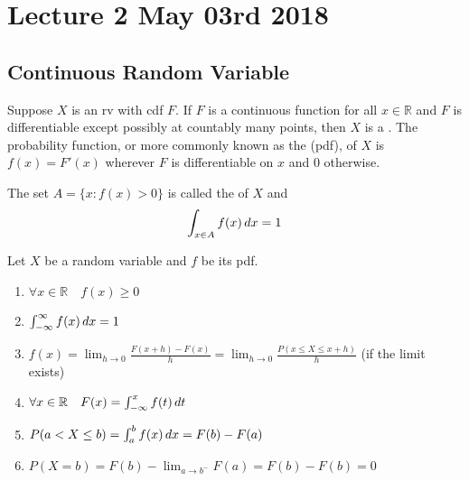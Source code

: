 \documentclass[notoc,notitlepage]{tufte-book}
\begin{document}


\chapter{Lecture 2 May 03rd 2018}
  \label{chapter:lecture_2_may_03rd_2018}

\section{Continuous Random Variable} %
\label{sec:continuous_random_variable}

\begin{defn}\label{defn:continuous_random_variable}
  Suppose $X$ is an rv with cdf $F$. If $F$ is a continuous function for all $x \in \mathbb{R}$ and $F$ is differentiable except possibly at countably many points, then $X$ is a . The probability function, or more commonly known as the  (pdf), of $X$ is $f(x) = F'(x)$ wherever $F$ is differentiable on $x$ and $0$ otherwise.

  The set $A = \{x : f(x) > 0\}$ is called the  of $X$ and
  \begin{equation*}
    \int_{x \in A} f(x) \mathop{}\!d{x} = 1
  \end{equation*}
\end{defn}

\begin{propo}\label{propo:properties_of_pdf}
Let $X$ be a random variable and $f$ be its pdf.
  \begin{enumerate}
    \item $\forall x \in \mathbb{R} \quad f(x) \geq 0$
    \item $\int_{-\infty}^{\infty} f(x) \mathop{}\!d{x} = 1$
    \item $f(x) = \lim_{h \to 0} \frac{F(x + h) - F(x)}{h} = \lim_{h \to 0} \frac{P(x \leq X \leq x + h)}{h}$ (if the limit exists)
    \item $\forall x \in \mathbb{R} \quad F(x) = \int_{-\infty}^{x} f(t) \mathop{}\!d{t}$
    \item $P(a < X \leq b) = \int_{a}^{b} f(x) \mathop{}\!d{x} = F(b) - F(a)$
    \item $P(X = b) = F(b) - \lim_{a \to b^{-}} F(a) = F(b) - F(b) = 0$
  \end{enumerate}
\end{propo}
\end{document}
